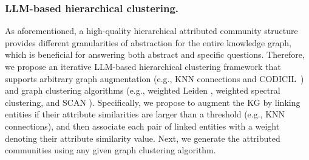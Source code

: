 
\subsubsection{LLM-based hierarchical clustering. } 
\label{sec:llm_cluster}
% 
As aforementioned, a high-quality hierarchical attributed community structure provides different granularities of abstraction for the entire knowledge graph, which is beneficial for answering both abstract and specific questions. 
% 
Therefore, we propose an iterative LLM-based hierarchical clustering framework that supports arbitrary graph augmentation (e.g., KNN connections and CODICIL~\cite{CODICIL2013efficient}) and graph clustering algorithms (e.g., weighted Leiden \cite{traag2019louvain}, weighted spectral clustering, and SCAN \cite{xu2007scan}).
% 
Specifically, we propose to augment the KG by linking entities if their attribute similarities are larger than a threshold (e.g., KNN connections), and then associate each pair of linked entities with a weight denoting their attribute similarity value.
%
Next, we generate the attributed communities using any given graph clustering algorithm.

